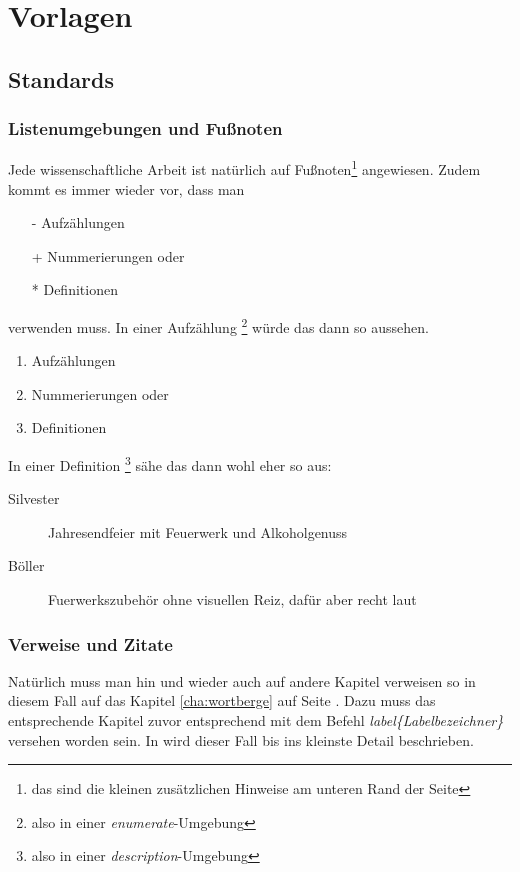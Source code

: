 \chapter{Vorlagen}
\label{cha:Vorlagen}

\section{Standards}
\subsection{Listenumgebungen und Fußnoten}
Jede wissenschaftliche Arbeit ist natürlich auf Fußnoten\footnote{das sind die kleinen zusätzlichen Hinweise am unteren Rand der Seite} angewiesen. Zudem kommt es immer wieder vor, dass man 
\begin{itemize}
\item[-] Aufzählungen
\item[+] Nummerierungen oder
\item[*] Definitionen 
\end{itemize}
verwenden muss. In einer Aufzählung \footnote{also in einer \textit{enumerate}-Umgebung} würde das dann so aussehen.
\begin{enumerate}
\item Aufzählungen
\item Nummerierungen oder
\item Definitionen 
\end{enumerate}

In einer Definition \footnote{also in einer \textit{description}-Umgebung} sähe das dann wohl eher so aus:

\begin{description}
\item[Silvester]Jahresendfeier mit Feuerwerk und Alkoholgenuss
\item[Böller] Fuerwerkszubehör ohne visuellen Reiz, dafür aber recht laut
\end{description}
\subsection{Verweise und Zitate}
Natürlich muss man hin und wieder auch auf andere Kapitel verweisen so \zB in diesem Fall auf das Kapitel \ref{cha:wortberge} auf Seite \pageref{cha:wortberge}. Dazu muss das entsprechende Kapitel zuvor entsprechend mit dem Befehl \textit{\bs label\{Labelbezeichner\}} versehen worden sein. In \cite{foobar2003} wird dieser Fall bis ins kleinste Detail beschrieben.

